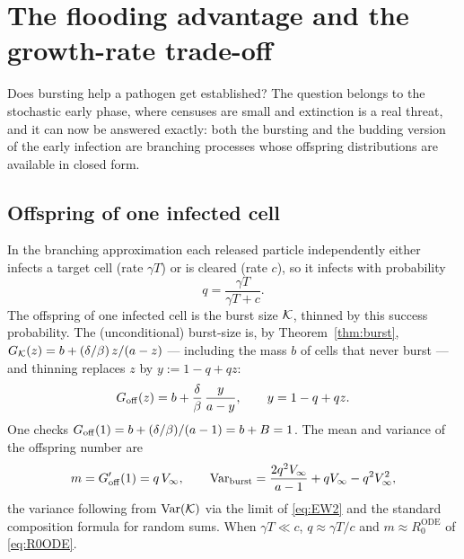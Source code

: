 
\section{The flooding advantage and the growth-rate trade-off}
\label{sec:flooding}

Does bursting help a pathogen get established? The question belongs to the
stochastic early phase, where censuses are small and extinction is a real
threat, and it can now be answered exactly: both the bursting and the
budding version of the early infection are branching processes whose
offspring distributions are available in closed form.

\subsection{Offspring of one infected cell}

In the branching approximation each released particle independently either
infects a target cell (rate $\gamma T$) or is cleared (rate $c$), so it
infects with probability
\begin{equation}
q=\frac{\gamma T}{\gamma T+c}.
\end{equation}
The offspring of one infected cell is the burst size $\mathcal{K}$, thinned by this
success probability. The (unconditional) burst-size \pgf{} is, by
Theorem~\ref{thm:burst},
$G_{\mathcal{K}}(z)=b+(\delta/\beta)\,z/(a-z)$ --- including the mass $b$ of cells
that never burst --- and thinning replaces $z$ by $y:=1-q+qz$:
\begin{equation}
G_{\rm off}(z)=b+\frac{\delta}{\beta}\,\frac{y}{a-y},
\qquad y=1-q+qz.
\label{eq:Goff}
\end{equation}
One checks $G_{\rm off}(1)=b+(\delta/\beta)/(a-1)=b+B=1$. The mean and
variance of the offspring number are
\begin{equation}
m=G_{\rm off}'(1)=q\,V_\infty,
\qquad
\mathrm{Var}_{\rm burst}
=\frac{2q^2V_\infty}{a-1}+qV_\infty-q^2V_\infty^2,
\label{eq:offmoments}
\end{equation}
the variance following from $\mathrm{Var}(\mathcal{K})$ via the limit of
\eqref{eq:EW2} and the standard composition formula for random sums. When
$\gamma T\ll c$, $q\approx\gamma T/c$ and $m\approx R_0^{\mathrm{ODE}}$ of
\eqref{eq:R0ODE}.

